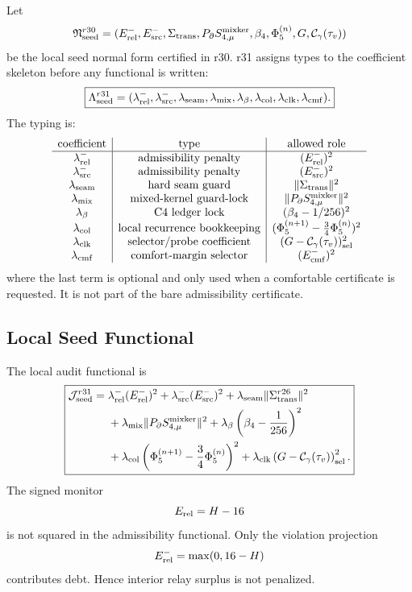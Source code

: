 Let
\[
\mathfrak N_{\rm seed}^{r30}
=
(E_{\rm rel}^{-},E_{\rm src}^{-},\Sigma_{\rm trans},
P_{\partial}S_{4,\mu}^{\rm mixker},\beta_4,
\Phi_5^{(n)},G,\mathcal C_{\gamma}(\tau_v))
\]
be the local seed normal form certified in r30.  r31 assigns types to the
coefficient skeleton before any functional is written:
\[
\boxed{
\Lambda_{\rm seed}^{r31}
=
(\lambda_{\rm rel}^{-},\lambda_{\rm src}^{-},\lambda_{\rm seam},
\lambda_{\rm mix},\lambda_{\beta},\lambda_{\rm col},
\lambda_{\rm clk},\lambda_{\rm cmf}) .
}
\]
The typing is:
\[
\begin{array}{c|c|c}
\text{coefficient} & \text{type} & \text{allowed role}\\
\hline
\lambda_{\rm rel}^{-} & \text{admissibility penalty} & (E_{\rm rel}^{-})^2\\
\lambda_{\rm src}^{-} & \text{admissibility penalty} & (E_{\rm src}^{-})^2\\
\lambda_{\rm seam} & \text{hard seam guard} & \|\Sigma_{\rm trans}\|^2\\
\lambda_{\rm mix} & \text{mixed-kernel guard-lock} & \|P_{\partial}S_{4,\mu}^{\rm mixker}\|^2\\
\lambda_{\beta} & \text{C4 ledger lock} & (\beta_4-1/256)^2\\
\lambda_{\rm col} & \text{local recurrence bookkeeping} & (\Phi_5^{(n+1)}-\tfrac34\Phi_5^{(n)})^2\\
\lambda_{\rm clk} & \text{selector/probe coefficient} & (G-\mathcal C_{\gamma}(\tau_v))^2_{\rm sel}\\
\lambda_{\rm cmf} & \text{comfort-margin selector} & (E_{\rm cmf}^{-})^2
\end{array}
\]
where the last term is optional and only used when a comfortable certificate is
requested.  It is not part of the bare admissibility certificate.

\subsection{Local Seed Functional}
\label{subsec:r31-local-seed-functional}

The local audit functional is
\[
\boxed{
\begin{aligned}
\mathcal J_{\rm seed}^{r31}
={}&
\lambda_{\rm rel}^{-}(E_{\rm rel}^{-})^2
+\lambda_{\rm src}^{-}(E_{\rm src}^{-})^2
+\lambda_{\rm seam}\|\Sigma_{\rm trans}^{r26}\|^2\\
&+\lambda_{\rm mix}\|P_{\partial}S_{4,\mu}^{\rm mixker}\|^2
+\lambda_{\beta}\left(\beta_4-\frac1{256}\right)^2\\
&+\lambda_{\rm col}\left(\Phi_5^{(n+1)}-\frac34\Phi_5^{(n)}\right)^2
+\lambda_{\rm clk}\left(G-\mathcal C_{\gamma}(\tau_v)\right)^2_{\rm sel}.
\end{aligned}
}
\]
The signed monitor
\[
E_{\rm rel}=H-16
\]
is not squared in the admissibility functional.  Only the violation projection
\[
E_{\rm rel}^{-}=\max(0,16-H)
\]
contributes debt.  Hence interior relay surplus is not penalized.

